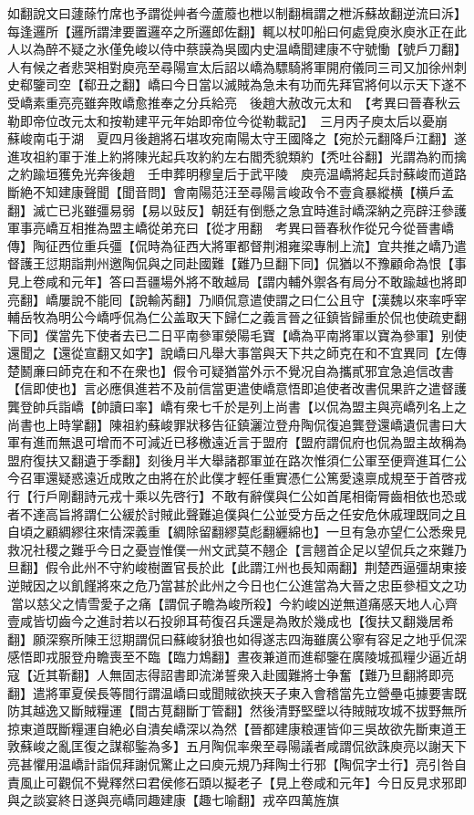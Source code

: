 如翻說文曰蘧蒢竹席也予謂從艸者今蘆䕠也枻以制翻楫謂之枻泝蘇故翻逆流曰泝】每逢邏所【邏所謂津要置邏卒之所邏郎佐翻】輒以杖叩船曰何處覓庾氷庾氷正在此人以為醉不疑之氷僅免峻以侍中蔡謨為吳國内史温嶠聞建康不守號慟【號戶刀翻】人有候之者悲哭相對庾亮至尋陽宣太后詔以嶠為驃騎將軍開府儀同三司又加徐州刺史郗鑒司空【郗丑之翻】嶠曰今日當以滅賊為急未有功而先拜官將何以示天下遂不受嶠素重亮亮雖奔敗嶠愈推奉之分兵給亮　後趙大赦改元太和　【考異曰晉春秋云勒即帝位改元太和按勒建平元年始即帝位今從勒載記】　三月丙子庾太后以憂崩　蘇峻南屯于湖　夏四月後趙將石堪攻宛南陽太守王國降之【宛於元翻降戶江翻】遂進攻祖約軍于淮上約將陳光起兵攻約約左右閻秃貌類約【秃吐谷翻】光謂為約而擒之約踰垣獲免光奔後趙　壬申葬明穆皇后于武平陵　庾亮温嶠將起兵討蘇峻而道路斷絶不知建康聲聞【聞音問】會南陽范汪至尋陽言峻政令不壹貪暴縱横【横戶孟翻】滅亡已兆雖彊易弱【易以䜴反】朝廷有倒懸之急宜時進討嶠深納之亮辟汪參護軍事亮嶠互相推為盟主嶠從弟充曰【從才用翻　考異曰晉春秋作從兄今從晉書嶠傳】陶征西位重兵彊【侃時為征西大將軍都督荆湘雍梁專制上流】宜共推之嶠乃遣督護王愆期詣荆州邀陶侃與之同赴國難【難乃旦翻下同】侃猶以不豫顧命為恨【事見上卷咸和元年】答曰吾疆場外將不敢越局【謂内輔外禦各有局分不敢踰越也將即亮翻】嶠屢說不能囘【說輸芮翻】乃順侃意遣使謂之曰仁公且守【漢魏以來率呼宰輔岳牧為明公今嶠呼侃為仁公盖取天下歸仁之義言晉之征鎮皆歸重於侃也使疏吏翻下同】僕當先下使者去已二日平南參軍滎陽毛寶【嶠為平南將軍以寶為參軍】别使還聞之【還從宣翻又如字】說嶠曰凡舉大事當與天下共之師克在和不宜異同【左傳楚鬭亷曰師克在和不在衆也】假令可疑猶當外示不覺况自為攜貳邪宜急追信改書【信即使也】言必應俱進若不及前信當更遣使嶠意悟即追使者改書侃果許之遣督護龔登帥兵詣嶠【帥讀曰率】嶠有衆七千於是列上尚書【以侃為盟主與亮嶠列名上之尚書也上時掌翻】陳祖約蘇峻罪狀移告征鎮灑泣登舟陶侃復追龔登還嶠遺侃書曰大軍有進而無退可增而不可減近已移檄遠近言于盟府【盟府謂侃府也侃為盟主故稱為盟府復扶又翻遺于季翻】刻後月半大舉諸郡軍並在路次惟須仁公軍至便齊進耳仁公今召軍還疑惑遠近成敗之由將在於此僕才輕任重實憑仁公篤愛遠禀成規至于首啓戎行【行戶剛翻詩元戎十乘以先啓行】不敢有辭僕與仁公如首尾相衛脣齒相依也恐或者不達高旨將謂仁公緩於討賊此聲難追僕與仁公並受方岳之任安危休戚理既同之且自頃之顧綢繆往來情深義重【綢除留翻繆莫彪翻纒綿也】一旦有急亦望仁公悉衆見救况社稷之難乎今日之憂豈惟僕一州文武莫不翹企【言翹首企足以望侃兵之來難乃旦翻】假令此州不守約峻樹置官長於此【此謂江州也長知兩翻】荆楚西逼彊胡東接逆賊因之以飢饉將來之危乃當甚於此州之今日也仁公進當為大晉之忠臣參桓文之功當以慈父之情雪愛子之痛【謂侃子瞻為峻所殺】今約峻凶逆無道痛感天地人心齊壹咸皆切齒今之進討若以石投卵耳苟復召兵還是為敗於幾成也【復扶又翻幾居希翻】願深察所陳王愆期謂侃曰蘇峻豺狼也如得遂志四海雖廣公寧有容足之地乎侃深感悟即戎服登舟瞻喪至不臨【臨力鴆翻】晝夜兼道而進郗鑒在廣陵城孤糧少逼近胡寇【近其靳翻】人無固志得詔書即流涕誓衆入赴國難將士争奮【難乃旦翻將即亮翻】遣將軍夏侯長等間行謂温嶠曰或聞賊欲挾天子東入會稽當先立營壘屯據要害既防其越逸又斷賊糧運【間古莧翻斷丁管翻】然後清野堅壁以待賊賊攻城不拔野無所掠東道既斷糧運自絶必自潰矣嶠深以為然【晉都建康粮運皆仰三吳故欲先斷東道王敦蘇峻之亂匡復之謀郗鍳為多】五月陶侃率衆至尋陽議者咸謂侃欲誅庾亮以謝天下亮甚懼用温嶠計詣侃拜謝侃驚止之曰庾元規乃拜陶士行邪【陶侃字士行】亮引咎自責風止可觀侃不覺釋然曰君侯修石頭以擬老子【見上卷咸和元年】今日反見求邪即與之談宴終日遂與亮嶠同趣建康【趣七喻翻】戎卒四萬旌旗